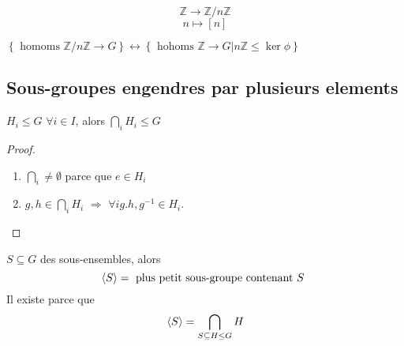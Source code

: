 \documentclass[../main.tex]{subfiles}
\begin{document}
\begin{exemple}
\[ 
\mathbb{Z} \to \mathbb{Z} / n \mathbb{Z}
\]
\[ 
n \mapsto [ n] 
\]

 $\left\{\text{  homoms } \mathbb{Z} / n \mathbb{Z} \to G \right\} \leftrightarrow \left\{ \text{ hohoms } \mathbb{Z} \to G | n \mathbb{Z} \leq \ker \phi \right\} $
\end{exemple}
\subsection{Sous-groupes engendres par plusieurs elements}
\begin{lemma}
$H_i \leq G$ $\forall i \in I$, alors $\bigcap_i H_i \leq G$
\end{lemma}
\begin{proof}
\begin{enumerate}
\item $\bigcap_i \neq \emptyset$ parce que $e \in H_i$ 
\item $g,h \in \bigcap_i H_i$ $\Rightarrow$ $\forall i g.h, g^{-1} \in H_i$.
\end{enumerate}
\end{proof}
\begin{defn}
$S \subseteq G$ des sous-ensembles, alors
\[ 
	\left\langle S\right\rangle = \text{ plus petit sous-groupe contenant $S$ } 
\]
Il existe parce que
\[ 
	\left\langle S\right\rangle = \bigcap_{S \subseteq H \leq G} H
\]

\end{defn}
\end{document}
